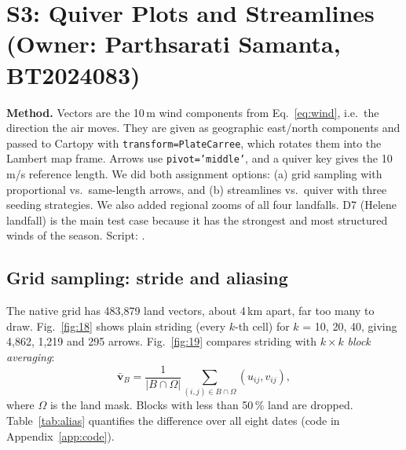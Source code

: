 \section{S3: Quiver Plots and Streamlines (Owner: Parthsarati Samanta, BT2024083)}
\label{sec:s3}
\textbf{Method.} Vectors are the 10\,m wind components from Eq.~\eqref{eq:wind}, i.e.\ the direction the air moves. They are
given as geographic east/north components and passed to Cartopy with \texttt{transform=PlateCarree}, which rotates them
into the Lambert map frame. Arrows use \texttt{pivot='middle'}, and a quiver key gives the 10\,m/s reference length. We did
both assignment options: (a) grid sampling with proportional vs.\ same-length arrows, and (b) streamlines vs.\ quiver with
three seeding strategies. We also added regional zooms of all four landfalls. D7 (Helene landfall) is the main test case
because it has the strongest and most structured winds of the season. Script: .

\subsection{Grid sampling: stride and aliasing}
The native grid has 483,879 land vectors, about 4\,km apart, far too many to draw. Fig.~\ref{fig:18} shows plain striding
(every $k$-th cell) for $k$ = 10, 20, 40, giving 4,862, 1,219 and 295 arrows. Fig.~\ref{fig:19} compares striding with
$k\times k$ \emph{block averaging}:
\begin{equation}
\bar{\mathbf{v}}_B = \frac{1}{|B\cap\Omega|}\sum_{(i,j)\in B\cap\Omega}(u_{ij},v_{ij}),
\end{equation}
where $\Omega$ is the land mask. Blocks with less than 50\,\% land are dropped. Table~\ref{tab:alias} quantifies the
difference over all eight dates (code in Appendix~\ref{app:code}).




